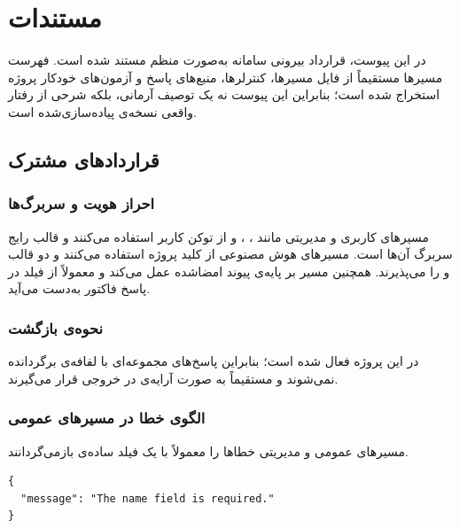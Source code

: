 \chapter{مستندات }
\label{app:api}

در این پیوست، قرارداد بیرونی سامانه به‌صورت منظم مستند شده است. فهرست مسیرها
مستقیماً از فایل مسیرها، کنترلرها، منبع‌های پاسخ و آزمون‌های خودکار پروژه
استخراج شده است؛ بنابراین این پیوست نه یک توصیف آرمانی، بلکه شرحی از
رفتار واقعی نسخه‌ی پیاده‌سازی‌شده است.

\section{قراردادهای مشترک}

\subsection*{احراز هویت و سربرگ‌ها}
مسیرهای کاربری و مدیریتی مانند ، ،
 و  از توکن  کاربر استفاده
می‌کنند و قالب رایج سربرگ آن‌ها
 است. مسیرهای هوش مصنوعی از
کلید پروژه استفاده می‌کنند و دو قالب
 و  را
می‌پذیرند. همچنین مسیر  بر
پایه‌ی پیوند امضاشده عمل می‌کند و معمولاً از فیلد  در پاسخ
فاکتور به‌دست می‌آید.

\subsection*{نحوه‌ی بازگشت }
در این پروژه  فعال شده است؛ بنابراین
پاسخ‌های مجموعه‌ای با لفافه‌ی  برگردانده نمی‌شوند و مستقیماً به
صورت آرایه‌ی  در خروجی قرار می‌گیرند.

\subsection*{الگوی خطا در مسیرهای عمومی}
مسیرهای عمومی و مدیریتی خطاها را معمولاً با یک فیلد ساده‌ی 
بازمی‌گردانند.

\begin{latin}
\begin{lstlisting}[style=jsonStyle]
{
  "message": "The name field is required."
}
\end{lstlisting}
\end{latin}

